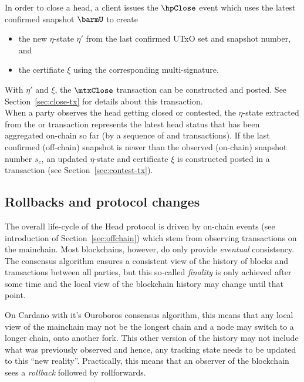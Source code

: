 \quad In order to close a head, a client issues the
$\hpClose$ event which uses the latest confirmed snapshot $\barmU$ to create
\begin{itemize}
	\item the new $\eta$-state $\eta'$ from the last confirmed UTxO set and snapshot
	      number, and
	\item the certifiate $\xi$ using the corresponding multi-signature.
\end{itemize}
With $\eta'$ and $\xi$, the $\mtxClose$ transaction can be constructed and
posted. See Section~\ref{sec:close-tx} for details about this transaction. \\

\quad When a party observes
the head getting closed or contested, the $\eta$-state extracted from the
\mtxClose{} or \mtxContest{} transaction represents the latest head status that
has been aggregated on-chain so far (by a sequence of \mtxClose{} and
\mtxContest{} transactions). If the last confirmed (off-chain) snapshot is newer
than the observed (on-chain) snapshot number $s_{c}$, an updated $\eta$-state
and certificate $\xi$ is constructed posted in a \mtxContest{} transaction (see
Section~\ref{sec:contest-tx}).

\subsection{Rollbacks and protocol changes}\label{sec:rollbacks}

The overall life-cycle of the Head protocol is driven by on-chain events (see
introduction of Section~\ref{sec:offchain}) which stem from observing
transactions on the mainchain. Most blockchains, however, do only provide
\emph{eventual} consistency. The consensus algorithm ensures a consistent view
of the history of blocks and transactions between all parties, but this
so-called \emph{finality} is only achieved after some time and the local view of
the blockchain history may change until that point.

On Cardano with it's Ouroboros consensus algorithm, this means that any local
view of the mainchain may not be the longest chain and a node may switch to a
longer chain, onto another fork. This other version of the history may not
include what was previously observed and hence, any tracking state needs to be
updated to this ``new reality''. Practically, this means that an observer of the
blockchain sees a \emph{rollback} followed by rollforwards.

